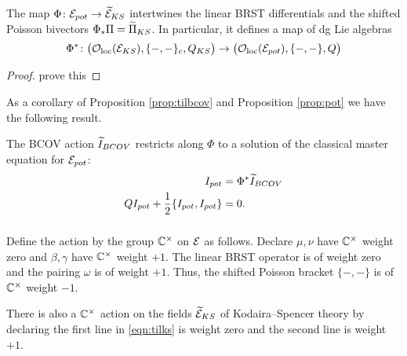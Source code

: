 \documentclass[11pt]{amsart}
\begin{document}
\begin{prop}
\label{prop:pot}
The map $\Phi \colon  \mathcal E_{pot} \to \widetilde{\mathcal E}_{KS}$ intertwines the linear BRST differentials and the shifted Poisson bivectors $\Phi_*\Pi = \widetilde{\Pi}_{KS}$. 
In particular, it defines a map of dg Lie algebras
\[
\Phi^* \colon \big({\mathcal O}_{\rm loc}(\mathcal E_{KS}),\{-,-\}_c, Q_{KS} \big) \to \big({\mathcal O}_{\rm loc}(\mathcal E_{pot}),\{-,-\}, Q \big)
\]
\end{prop}

\begin{proof}
prove this
\end{proof}

As a corollary of Proposition \ref{prop:tilbcov} and Proposition \ref{prop:pot} we have the following result. 

\begin{cor}
The BCOV action $\widetilde{I}_{BCOV}$ restricts along $\Phi$ to a solution of the classical master equation for $\mathcal E_{pot}$:
\begin{align*}
I_{pot} & = \Phi^* \widetilde{I}_{BCOV} \\
Q I_{pot} + \frac12 \{I_{pot},I_{pot}\} & = 0 .
\end{align*} 
\end{cor} 

\subsubsection{}

Define the action by the group $\mathbb C^\times$ on $\mathcal E$ as follows. 
Declare $\mu, \nu$ have $\mathbb C^\times$ weight zero and $\beta,\gamma$ have $\mathbb C^\times$ weight $+1$. 
The linear BRST operator is of weight zero and the pairing $\omega$ is of weight $+1$. 
Thus, the shifted Poisson bracket $\{-,-\}$ is of $\mathbb C^\times$ weight $-1$.

There is also a $\mathbb C^\times$ action on the fields $\widetilde{\mathcal E}_{KS}$ of Kodaira--Spencer theory by declaring the first line in \eqref{eqn:tilks} is weight zero and the second line is weight $+1$. 
\end{document}
